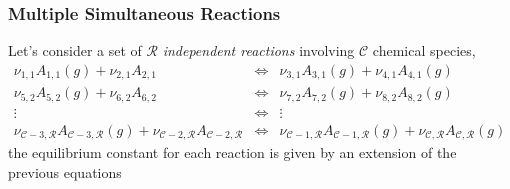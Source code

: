 \documentclass[10pt,compress,handout,unknownkeysallowed]{beamer}
\begin{document}
\begin{frame}
  \frametitle{Multiple Simultaneous Reactions}
      Let's consider a set of $\mathcal{R}$ {\it independent reactions} involving $\mathcal{C}$ chemical species, 
               \begin{eqnarray}
                     \nu_{1,1}A_{1,1} (g) + \nu_{2,1}A_{2,1} &\Longleftrightarrow& \nu_{3,1}A_{3,1} (g) + \nu_{4,1}A_{4,1} (g) \nonumber\\
                     \nu_{5,2}A_{5,2} (g) + \nu_{6,2}A_{6,2} &\Longleftrightarrow& \nu_{7,2}A_{7,2} (g) + \nu_{8,2}A_{8,2} (g)  \nonumber\\
                                 \vdots               &\Longleftrightarrow&     \vdots                         \nonumber\\
                     \nu_{\mathcal{C}-3,\mathcal{R}}A_{\mathcal{C}-3,\mathcal{R}} (g) + \nu_{\mathcal{C}-2,\mathcal{R}}A_{\mathcal{C}-2,\mathcal{R}} &\Longleftrightarrow& \nu_{\mathcal{C}-1,\mathcal{R}}A_{\mathcal{C}-1,\mathcal{R}} (g) + \nu_{\mathcal{C},\mathcal{R}}A_{\mathcal{C},\mathcal{R}} (g) \nonumber
               \end{eqnarray}
      the equilibrium constant for each reaction is given by an extension of the previous equations


\end{frame}
\normalsize
\end{document}
